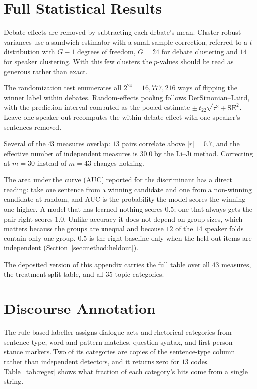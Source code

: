 \documentclass[journal]{IEEEtran}
\begin{document}
\section{Full Statistical Results}
\label{app:stats}

Debate effects are removed by subtracting each debate's mean. Cluster-robust
variances use a sandwich estimator with a small-sample correction, referred to
a $t$ distribution with $G-1$ degrees of freedom, $G = 24$ for debate
clustering and $14$ for speaker clustering. With this few clusters the
$p$-values should be read as generous rather than exact.

The randomization test enumerates all $2^{24} = 16{,}777{,}216$ ways of
flipping the winner label within debates. Random-effects pooling follows
DerSimonian--Laird, with the prediction interval computed as the pooled
estimate $\pm\, t_{22}\sqrt{\tau^2 + \mathrm{SE}^2}$. Leave-one-speaker-out
recomputes the within-debate effect with one speaker's sentences removed.

Several of the $43$ measures overlap: $13$ pairs correlate above $|r| = 0.7$,
and the effective number of independent measures is $30.0$ by the Li--Ji
method. Correcting at $m = 30$ instead of $m = 43$ changes nothing.

The area under the curve (AUC) reported for the discriminant has a direct
reading: take one sentence from a winning candidate and one from a non-winning
candidate at random, and AUC is the probability the model scores the winning
one higher. A model that has learned nothing scores $0.5$; one that always
gets the pair right scores $1.0$. Unlike accuracy it does not depend on group
sizes, which matters because the groups are unequal and because $12$ of the
$14$ speaker folds contain only one group. $0.5$ is the right baseline only
when the held-out items are independent (Section~\ref{sec:method:heldout}).

The deposited version of this appendix carries the full table over all $43$
measures, the treatment-split table, and all $35$ topic categories.

\section{Discourse Annotation}
\label{app:tagging}

The rule-based labeller assigns dialogue acts and rhetorical categories from
sentence type, word and pattern matches, question syntax, and first-person
stance markers. Two of its categories are copies of the sentence-type column
rather than independent detectors, and it returns zero for $13$ codes.
Table~\ref{tab:regex} shows what fraction of each category's hits come from
a single string.
\end{document}

